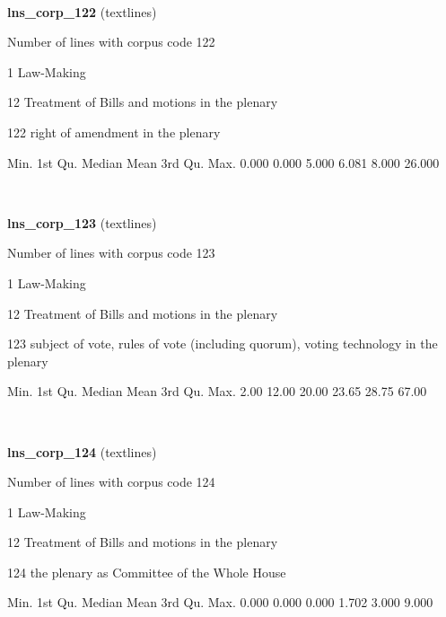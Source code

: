 \documentclass[]{article}
\newenvironment{Shaded}{\begin{snugshade}}{\end{snugshade}}
\newcommand{\FloatTok}[1]{\textcolor[rgb]{0.00,0.00,0.81}{{#1}}}
\newcommand{\NormalTok}[1]{{#1}}
\begin{document}
~

\vspace{1em}

\textbf{lns\_corp\_122} (textlines)

Number of lines with corpus code 122

1 Law-Making

12 Treatment of Bills and motions in the plenary

122 right of amendment in the plenary

\begin{Shaded}
\begin{Highlighting}[]
   \NormalTok{Min. 1st Qu.  Median    Mean 3rd Qu.    Max. }
  \FloatTok{0.000}   \FloatTok{0.000}   \FloatTok{5.000}   \FloatTok{6.081}   \FloatTok{8.000}  \FloatTok{26.000} 
\end{Highlighting}
\end{Shaded}

~

\vspace{1em}

\textbf{lns\_corp\_123} (textlines)

Number of lines with corpus code 123

1 Law-Making

12 Treatment of Bills and motions in the plenary

123 subject of vote, rules of vote (including quorum), voting technology
in the plenary

\begin{Shaded}
\begin{Highlighting}[]
   \NormalTok{Min. 1st Qu.  Median    Mean 3rd Qu.    Max. }
   \FloatTok{2.00}   \FloatTok{12.00}   \FloatTok{20.00}   \FloatTok{23.65}   \FloatTok{28.75}   \FloatTok{67.00} 
\end{Highlighting}
\end{Shaded}

~

\vspace{1em}

\textbf{lns\_corp\_124} (textlines)

Number of lines with corpus code 124

1 Law-Making

12 Treatment of Bills and motions in the plenary

124 the plenary as Committee of the Whole House

\begin{Shaded}
\begin{Highlighting}[]
   \NormalTok{Min. 1st Qu.  Median    Mean 3rd Qu.    Max. }
  \FloatTok{0.000}   \FloatTok{0.000}   \FloatTok{0.000}   \FloatTok{1.702}   \FloatTok{3.000}   \FloatTok{9.000} 
\end{Highlighting}
\end{Shaded}
\end{document}
